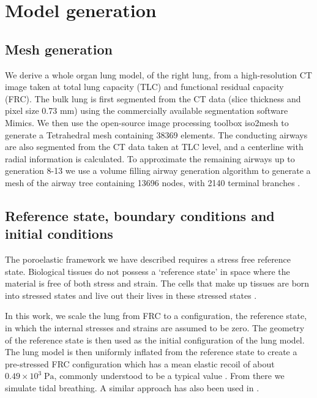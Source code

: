 \section{Model generation}
\label{sec:model_generation}

\subsection{Mesh generation}
We derive a whole organ lung model, of the right lung, from a high-resolution CT image taken at total lung capacity (TLC) and functional residual capacity (FRC). The bulk lung is first segmented from the CT data (slice thickness and pixel size 0.73 mm) using the commercially available segmentation software Mimics\footnotemark[1]. We then use the open-source image processing toolbox iso2mesh \cite{fang2009tetrahedral} to generate a Tetrahedral mesh containing 38369 elements. The conducting airways are also segmented from the CT data taken at TLC level, and a centerline with radial information is calculated. To approximate the remaining airways up to generation 8-13 we use a volume filling airway generation algorithm to generate a mesh of the airway tree containing 13696 nodes, with 2140 terminal branches \cite{bordas2014}.
%

\subsection{Reference state, boundary conditions and initial conditions}
\label{sec:ref_state_bcs}
%
The poroelastic framework we have described requires a stress free reference state. Biological tissues do not possess a `reference state' in space where the material is free of both stress and strain. The cells that make up tissues are born into stressed states and live out their lives in these stressed states \cite{freed2013implicit}.

In this work, we scale the lung from FRC to a configuration, the reference state, in which the internal stresses and strains are assumed to be zero. The geometry of the reference state is then used as the initial configuration
of the lung model. The lung model is then uniformly inflated from the reference state to create a pre-stressed FRC configuration which has a mean elastic recoil of about $0.49 \times 10^{3} \;\mbox{Pa} $, commonly understood to be a typical value \cite{west2008respiratory}. From there we simulate tidal breathing. A similar approach has also been used in \cite{lee1983finite}.

